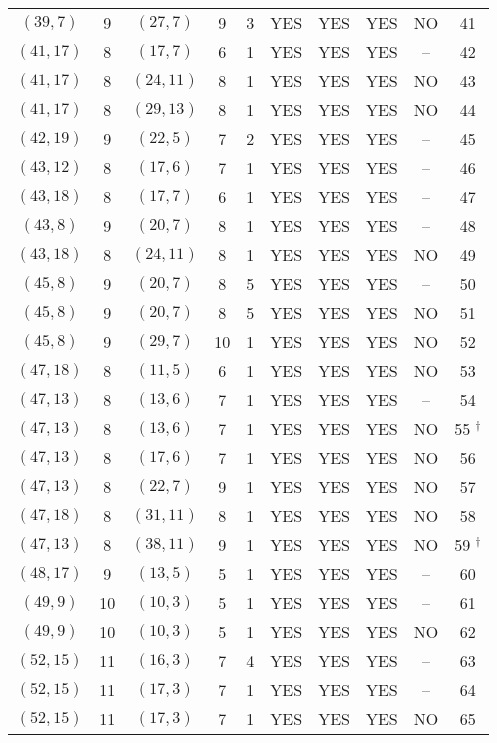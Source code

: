 \begin{longtable}{|c|c|c|c|c|c|c|c|c|c|}
$(39, 7)$ & 9 & $(27, 7)$ & 9 & 3 & YES & YES & YES & NO & 41\\
$(41, 17)$ & 8 & $(17, 7)$ & 6 & 1 & YES & YES & YES & -- & 42\\
$(41, 17)$ & 8 & $(24, 11)$ & 8 & 1 & YES & YES & YES & NO & 43\\
$(41, 17)$ & 8 & $(29, 13)$ & 8 & 1 & YES & YES & YES & NO & 44\\
$(42, 19)$ & 9 & $(22, 5)$ & 7 & 2 & YES & YES & YES & -- & 45\\
$(43, 12)$ & 8 & $(17, 6)$ & 7 & 1 & YES & YES & YES & -- & 46\\
$(43, 18)$ & 8 & $(17, 7)$ & 6 & 1 & YES & YES & YES & -- & 47\\
$(43, 8)$ & 9 & $(20, 7)$ & 8 & 1 & YES & YES & YES & -- & 48\\
$(43, 18)$ & 8 & $(24, 11)$ & 8 & 1 & YES & YES & YES & NO & 49\\
$(45, 8)$ & 9 & $(20, 7)$ & 8 & 5 & YES & YES & YES & -- & 50\\
$(45, 8)$ & 9 & $(20, 7)$ & 8 & 5 & YES & YES & YES & NO & 51\\
$(45, 8)$ & 9 & $(29, 7)$ & 10 & 1 & YES & YES & YES & NO & 52\\
$(47, 18)$ & 8 & $(11, 5)$ & 6 & 1 & YES & YES & YES & NO & 53\\
$(47, 13)$ & 8 & $(13, 6)$ & 7 & 1 & YES & YES & YES & -- & 54\\
$(47, 13)$ & 8 & $(13, 6)$ & 7 & 1 & YES & YES & YES & NO & 55 ${}^\dagger$\\
$(47, 13)$ & 8 & $(17, 6)$ & 7 & 1 & YES & YES & YES & NO & 56\\
$(47, 13)$ & 8 & $(22, 7)$ & 9 & 1 & YES & YES & YES & NO & 57\\
$(47, 18)$ & 8 & $(31, 11)$ & 8 & 1 & YES & YES & YES & NO & 58\\
$(47, 13)$ & 8 & $(38, 11)$ & 9 & 1 & YES & YES & YES & NO & 59 ${}^\dagger$\\
$(48, 17)$ & 9 & $(13, 5)$ & 5 & 1 & YES & YES & YES & -- & 60\\
$(49, 9)$ & 10 & $(10, 3)$ & 5 & 1 & YES & YES & YES & -- & 61\\
$(49, 9)$ & 10 & $(10, 3)$ & 5 & 1 & YES & YES & YES & NO & 62\\
$(52, 15)$ & 11 & $(16, 3)$ & 7 & 4 & YES & YES & YES & -- & 63\\
$(52, 15)$ & 11 & $(17, 3)$ & 7 & 1 & YES & YES & YES & -- & 64\\
$(52, 15)$ & 11 & $(17, 3)$ & 7 & 1 & YES & YES & YES & NO & 65\\

\end{longtable}
